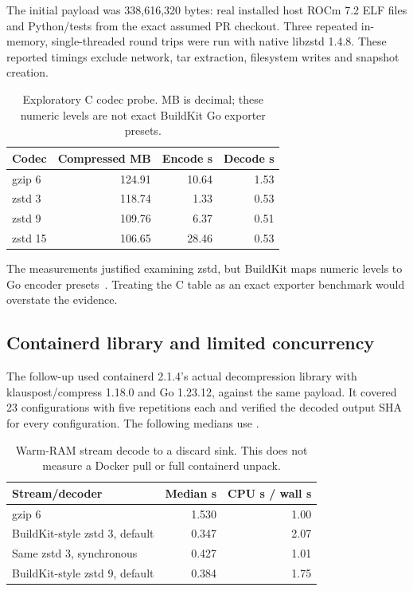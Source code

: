 \documentclass[11pt,a4paper]{article}
\newcommand{\term}[1]{\texttt{\detokenize{#1}}}
\begin{document}
The initial payload was 338,616,320 bytes: real installed host ROCm 7.2 ELF files
and Python/tests from the exact assumed PR checkout. Three repeated in-memory,
single-threaded round trips were run with native libzstd 1.4.8. These reported
timings exclude network, tar extraction, filesystem writes and snapshot creation.

\begin{table}[htbp]
\centering
\begin{tabular}{lrrr}
\toprule
Codec & Compressed MB & Encode s & Decode s \\
\midrule
gzip 6 & 124.91 & 10.64 & 1.53 \\
zstd 3 & 118.74 & 1.33 & 0.53 \\
zstd 9 & 109.76 & 6.37 & 0.51 \\
zstd 15 & 106.65 & 28.46 & 0.53 \\
\bottomrule
\end{tabular}
\caption{Exploratory C codec probe. MB is decimal; these numeric levels are
not exact BuildKit Go exporter presets.}
\end{table}

The measurements justified examining zstd, but BuildKit maps numeric levels to
Go encoder presets~\cite{buildkitzstd}. Treating the C table as an exact exporter
benchmark would overstate the evidence.

\subsection{Containerd library and limited concurrency}

The follow-up used containerd 2.1.4's actual decompression library with
klauspost/compress 1.18.0 and Go 1.23.12, against the same payload. It covered 23
configurations with five repetitions each and verified the decoded output SHA
for every configuration. The following medians use \term{GOMAXPROCS=4}.

\begin{table}[htbp]
\centering
\begin{tabularx}{\textwidth}{Xrr}
\toprule
Stream/decoder & Median s & CPU s / wall s \\
\midrule
gzip 6 & 1.530 & 1.00 \\
BuildKit-style zstd 3, default & 0.347 & 2.07 \\
Same zstd 3, synchronous & 0.427 & 1.01 \\
BuildKit-style zstd 9, default & 0.384 & 1.75 \\
\bottomrule
\end{tabularx}
\caption{Warm-RAM stream decode to a discard sink. This does not measure a
Docker pull or full containerd unpack.}
\end{table}
\end{document}

